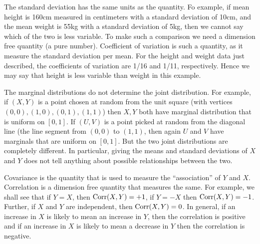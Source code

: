 \documentclass[preprint,  11pt]{amsart}
\begin{document}
The standard deviation has the same units as the quantity. Fo example, if mean height is 160cm  measured in centimeters with a standard deviation of 10cm, and the mean weight is 55kg with a  standard deviation of 5kg, then we cannot say which of the two is less variable. To make such a comparison we need a dimension free quantity (a pure number). Coefficient of variation is such a quantity, as it measure the standard deviation per mean. For the height and weight data just described, the coefficients of variation are 1/16 and 1/11, respectively. Hence we may say that height is less variable than weight in this example. 


 The marginal distributions do not determine the joint distribution. For example, if $(X,Y)$ is a point chosen at random from the unit square (with vertices $(0,0),(1,0),(0,1),(1,1)$) then $X,Y$ both have marginal distribution that is uniform on $[0,1]$. If $(U,V)$ is a point picked at random from the diagonal line (the line segment from $(0,0)$ to $(1,1)$, then again $U$ and $V$ have marginals that are uniform on $[0,1]$. 
But the two joint distributions are completely different. In particular, giving the means and standard deviations of $X$ and $Y$ does not tell anything about possible relationships between the two. 

Covariance is the quantity that is used to measure the ``association'' of $Y$ and $X$. Correlation is a dimension free quantity that measures the same. For example, we shall see that if $Y=X$, then $\mbox{Corr}(X,Y)=+1$, if $Y=-X$ then $\mbox{Corr}(X,Y)=-1$. Further, if $X$ and $Y$ are independent, then $\mbox{Corr}(X,Y)=0$. In general, if an increase in $X$ is likely to mean an increase in $Y$, then the correlation is positive and if an increase in $X$ is likely to mean a decrease in $Y$ then the correlation is negative.
\end{document}
